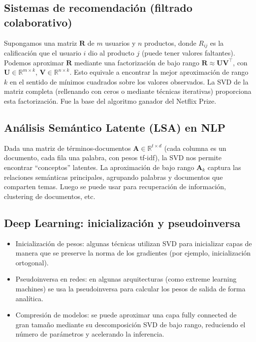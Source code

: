 \documentclass[12pt,a4paper,openany,oneside]{book}
\begin{document}
\begin{center}
\end{center}

\subsection{Sistemas de recomendación (filtrado colaborativo)}
Supongamos una matriz $\mathbf{R}$ de $m$ usuarios y $n$ productos, donde $R_{ij}$ es la calificación que el usuario $i$ dio al producto $j$ (puede tener valores faltantes). Podemos aproximar $\mathbf{R}$ mediante una factorización de bajo rango $\mathbf{R} \approx \mathbf{U} \mathbf{V}^\top$, con $\mathbf{U} \in \mathbb{R}^{m \times k}$, $\mathbf{V} \in \mathbb{R}^{n \times k}$. Esto equivale a encontrar la mejor aproximación de rango $k$ en el sentido de mínimos cuadrados sobre los valores observados. La SVD de la matriz completa (rellenando con ceros o mediante técnicas iterativas) proporciona esta factorización. Fue la base del algoritmo ganador del Netflix Prize.

\subsection{Análisis Semántico Latente (LSA) en NLP}
Dada una matriz de términos-documentos $\mathbf{A} \in \mathbb{R}^{t \times d}$ (cada columna es un documento, cada fila una palabra, con pesos tf-idf), la SVD nos permite encontrar ``conceptos'' latentes. La aproximación de bajo rango $\mathbf{A}_k$ captura las relaciones semánticas principales, agrupando palabras y documentos que comparten temas. Luego se puede usar para recuperación de información, clustering de documentos, etc.

\subsection{Deep Learning: inicialización y pseudoinversa}
\begin{itemize}
    \item Inicialización de pesos: algunas técnicas utilizan SVD para inicializar capas de manera que se preserve la norma de los gradientes (por ejemplo, inicialización ortogonal).
    \item Pseudoinversa en redes: en algunas arquitecturas (como extreme learning machines) se usa la pseudoinversa para calcular los pesos de salida de forma analítica.
    \item Compresión de modelos: se puede aproximar una capa fully connected de gran tamaño mediante su descomposición SVD de bajo rango, reduciendo el número de parámetros y acelerando la inferencia.
\end{itemize}
\end{document}
